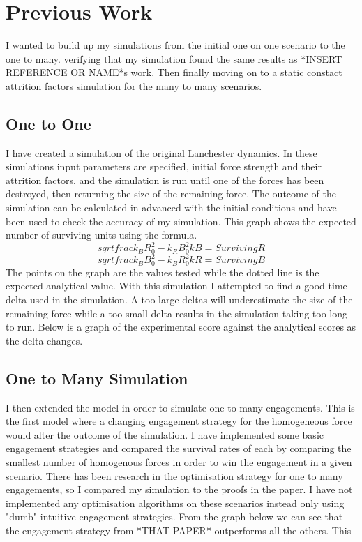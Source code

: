 \chapter{Previous Work} \label{Chapter:two}

I wanted to build up my simulations from the initial one on one scenario to the one to many. verifying that my simulation found the same results as *INSERT REFERENCE OR NAME*s work. Then finally moving on to a static constact attrition factors simulation for the many to many scenarios. 

\section{One to One}

I have created a simulation of the original Lanchester dynamics. In these simulations input parameters are specified, initial force strength and their attrition factors, and the simulation is run until one of the forces has been destroyed, then returning the size of the remaining force. The outcome of the simulation can be calculated in advanced with the initial conditions and have been used to check the accuracy of my simulation.  
This graph shows the expected number of surviving units using the formula.
\[ sqrt{frac{k_B R_0^2 - k_R B_0^2} {kB} } = Surviving R\]
\[ sqrt{frac{k_B B_0^2 - k_B R_0^2} {kR} } = Surviving B\]
The points on the graph are the values tested while the dotted line is the expected analytical value. With this simulation I attempted to find a good time delta used in the simulation. A too large deltas will underestimate the size of the remaining force while a too small delta results in the simulation taking too long to run. Below is a graph of the experimental score against the analytical scores as the delta changes.

\section{One to Many Simulation}

I then extended the model in order to simulate one to many engagements. This is the first model where a changing engagement strategy for the homogeneous force would alter the outcome of the simulation. I have implemented some basic engagement strategies and compared the survival rates of each by comparing the smallest number of homogenous forces in order to win the engagement in a given scenario. There has been research in the optimisation strategy for one to many engagements, so I compared my simulation to the proofs in the paper. I have not implemented any optimisation algorithms on these scenarios instead only using "dumb" intuitive engagement strategies. From the graph below we can see that the engagement strategy from *THAT PAPER* outperforms all the others. This 

